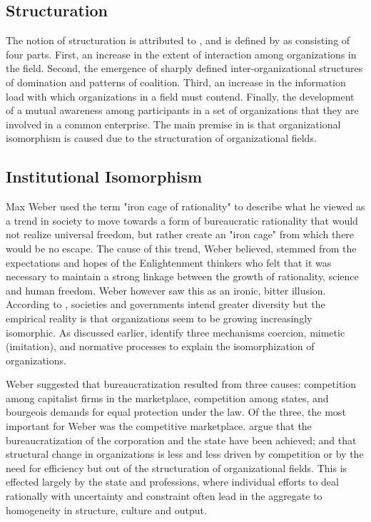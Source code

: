 \documentclass[12pt]{article}
\begin{document}
\subsection{Structuration}
The notion of structuration is attributed to \cite{Giddens1979}, and is defined by \cite{Dimaggio1983} as consisting of  four parts. First, an increase in the extent of interaction among organizations in the field. Second, the emergence of sharply defined inter-organizational structures of domination and patterns of coalition. Third, an increase in the information load with which organizations in a field must contend. Finally, the development of a mutual awareness among participants in a set of organizations that they are involved in a common enterprise. The main premise in \cite{Dimaggio1983} is that organizational isomorphism is caused due to the structuration of organizational fields.


\subsection{Institutional Isomorphism}
Max Weber used the term "iron cage of rationality" to describe what he viewed as a trend in society to move towards a form of bureaucratic rationality that would not realize universal freedom, but rather create an "iron cage" from which there would be no escape. The cause of this trend, Weber believed, stemmed from the expectations and hopes of the Enlightenment thinkers who felt that it was necessary to maintain a strong linkage between the growth of rationality, science and human freedom. Weber however saw this as an ironic, bitter illusion. According to \cite{Dimaggio1983}, societies and governments intend greater diversity but the empirical reality is that organizations seem to be growing increasingly isomorphic. As discussed earlier,  \cite{Dimaggio1983} identify three mechanisms coercion, mimetic (imitation), and normative processes to explain the isomorphization of organizations.

Weber suggested that bureaucratization resulted from three causes: competition among capitalist firms in the marketplace, competition among states, and bourgeois demands for equal protection under the law. Of the three, the most important for Weber was the competitive marketplace. \cite{Dimaggio1983} argue that the bureaucratization of the corporation and the state have been achieved; and that structural change in organizations is less and less driven by competition or by the need for efficiency but out of the structuration of organizational fields. This is effected largely by the state and professions, where individual efforts to deal rationally with uncertainty and constraint often lead in the aggregate to homogeneity in structure, culture and output.
\end{document}
